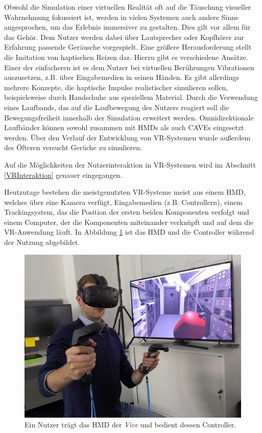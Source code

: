 Obwohl die Simulation einer virtuellen Realität oft auf die Täuschung visueller Wahrnehmung fokussiert ist, werden in vielen Systemen auch andere Sinne angesprochen, um das Erlebnis immersiver zu gestalten. Dies gilt vor allem für das Gehör. Dem Nutzer werden dabei über Lautsprecher oder Kopfhörer zur Erfahrung passende Geräusche vorgespielt.
Eine größere Herausforderung stellt die Imitation von haptischen Reizen dar. Hierzu gibt es verschiedene Ansätze. Einer der einfacheren ist es dem Nutzer bei virtuellen Berührungen Vibrationen auszusetzen, z.B. über Eingabemedien in seinen Händen. Es gibt allerdings mehrere Konzepte, die haptische Impulse realistischer simulieren sollen, beispielsweise durch Handschuhe aus speziellem Material. %
Durch die Verwendung eines Laufbands, das auf die Laufbewegung des Nutzers reagiert soll die Bewegungsfreiheit innerhalb der Simulation erweitert werden. Omnidirektionale Laufbänder können sowohl zusammen mit HMDs als auch CAVEs eingesetzt werden.
Über den Verlauf der Entwicklung von VR-Systemen wurde außerdem des Öfteren versucht Gerüche zu simulieren. %

Auf die Möglichkeiten der Nutzerinteraktion in VR-Systemen wird im Abschnitt \ref{VRInteraktion} genauer eingegangen.

Heutzutage bestehen die meistgenutzten VR-Systeme meist aus einem HMD, welches über eine Kamera verfügt, Eingabemedien (z.B. Controllern), einem Trackingsystem, das die Position der ersten beiden Komponenten verfolgt und einem Computer, der die Komponenten miteinander verknüpft und auf dem die VR-Anwendung läuft. 
In Abbildung \ref{img:vive} ist das HMD und die Controller während der Nutzung abgebildet.

\begin{figure}[!htb]
	\centering
	\includegraphics[width=0.5\linewidth]{images/vive.jpg}
	\caption{Ein Nutzer trägt das HMD der \textit{Vive} und bedient dessen Controller.}
	\label{img:vive}
\end{figure}
\FloatBarrier

